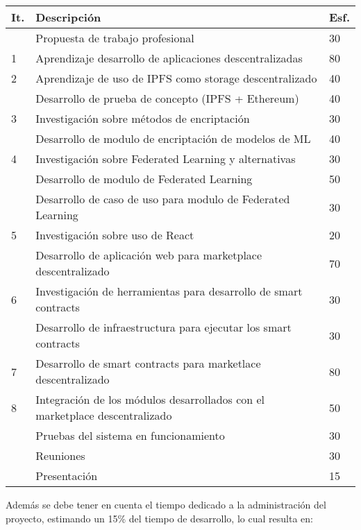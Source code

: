 \documentclass[
11pt, %
oneside, %
spanish, %
singlespacing, %
headsepline, %
chapterinoneline, %
]{MastersDoctoralThesis} %
\begin{document}
{
\setlength{\extrarowheight}{.2em}
\begin{center}
	\begin{tabularx}{\textwidth}{|l|X|l|}
    \hline
    \textbf{It.} & \textbf{Descripción} & \textbf{Esf.}  \\ \hline
	\- & Propuesta de trabajo profesional & 30 \\ \hline  
    1 & Aprendizaje desarrollo de aplicaciones descentralizadas & 80 \\ \hline 
    2 & Aprendizaje de uso de IPFS como storage descentralizado & 40 \\
      & Desarrollo de prueba de concepto (IPFS + Ethereum) & 40 \\ \hline
    3 & Investigación sobre métodos de encriptación & 30 \\
      & Desarrollo de modulo de encriptación de modelos de ML & 40 \\ \hline
    4 & Investigación sobre Federated Learning y alternativas & 30 \\ 
      & Desarrollo de modulo de Federated Learning & 50 \\ 
      & Desarrollo de caso de uso para modulo de Federated Learning & 30 \\ \hline
    5 & Investigación sobre uso de React & 20 \\  
      & Desarrollo de aplicación web para marketplace descentralizado & 70 \\ \hline
    6 & Investigación de herramientas para desarrollo de smart contracts & 30 \\
      & Desarrollo de infraestructura para ejecutar los smart contracts & 30 \\ \hline 
    7 & Desarrollo de smart contracts para marketlace descentralizado & 80 \\ \hline
    8 & Integración de los módulos desarrollados con el marketplace descentralizado & 50 \\ 
      & Pruebas del sistema en funcionamiento & 30 \\ \hline
      & Reuniones & 30 \\ \hline
      & Presentación & 15 \\ \hline
    \end{tabularx}
\end{center}
}

Además se debe tener en cuenta el tiempo dedicado a la administración del proyecto, estimando un 15\% del tiempo de desarrollo, lo cual resulta en:
\end{document}
